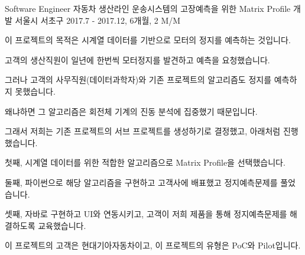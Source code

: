 \begin{cventries}
  \cventry
    {Software Engineer} %
    {자동차 생산라인 운송시스템의 고장예측을 위한 Matrix Profile 개발} %
    {서울시 서초구} %
    {2017.7 - 2017.12, 6개월, 2 M/M} %
    {
      \begin{cvitems} %
        \item {이 프로젝트의 목적은 시계열 데이터를 기반으로 모터의 정지를 예측하는 것입니다.}
        \item {고객의 생산직원이 일년에 한번씩 모터정지를 발견하고 예측을 요청했습니다.}
        \item {그러나 고객의 사무직원(데이터과학자)와 기존 프로젝트의 알고리즘도 정지를 예측하지 못했습니다.}
        \item {왜냐하면 그 알고리즘은 회전체 기계의 진동 분석에 집중했기 때문입니다.}
        \item {그래서 저희는 기존 프로젝트의 서브 프로젝트를 생성하기로 결정했고, 아래처럼 진행했습니다.}
        \item {첫째, 시계열 데이터를 위한 적합한 알고리즘으로 Matrix Profile을 선택했습니다.}
        \item {둘째, 파이썬으로 해당 알고리즘을 구현하고 고객사에 배표했고 정지예측문제를 풀었습니다.}
        \item {셋째, 자바로 구현하고 UI와 연동시키고, 고객이 저희 제품을 통해 정지예측문제를 해결하도록 교육했습니다.}
        \item {이 프로젝트의 고객은 현대기아자동차이고, 이 프로젝트의 유형은 PoC와 Pilot입니다.}
      \end{cvitems}
    }


\end{cventries}
